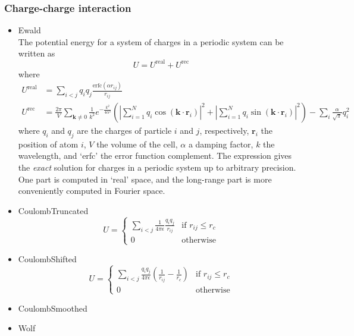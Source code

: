 \subsubsection{Charge-charge interaction}
\begin{itemize}
\item{Ewald}\\
The potential energy for a system of charges in a periodic system can be written as
\begin{equation}
 U=U^{\text{real}}+U^{\text{rec}}
\end{equation}
where
\begin{equation}
 \begin{split}
 U^{\text{real}}
  &=\sum_{i<j} q_i q_j \frac{\text{erfc}\left(\alpha r_{ij}\right)}{r_{ij}}\\
 U^{\text{rec}}
  &=\frac{2\pi}{V}\sum_{\mathbf{k}\not=0}\frac{1}{k^2} e^{-\frac{k^2}{4\alpha^2}}
  \left(\left|\sum_{i=1}^N q_i\cos\left(\mathbf{k}\cdot\mathbf{r}_i\right)\right|^2+
   \left|\sum_{i=1}^N q_i\sin\left(\mathbf{k}\cdot\mathbf{r}_i\right)\right|^2\right)
 -\sum_i\frac{\alpha}{\sqrt{\pi}}q_i^2
 \end{split}
\end{equation}
where $q_i$ and $q_j$ are the charges of particle $i$ and $j$, respectively, $\mathbf{r}_i$ the position of atom $i$, $V$ the volume of the cell,
$\alpha$ a damping factor, $k$ the wavelength, and `erfc' the error function complement. The expression gives the \emph{exact} solution for charges
in a periodic system up to arbitrary precision. One part is computed in `real' space, and the long-range part is more conveniently computed in Fourier space.

\item{CoulombTruncated}
\begin{equation}
 U=\begin{cases}
    \sum_{i<j} \frac{1}{4\pi\epsilon}\frac{q_i q_j}{r_{ij}}& \text{if }r_{ij}\leq r_c\\
    0 & \text{otherwise}
   \end{cases}
\end{equation}

\item{CoulombShifted}
\begin{equation}
 U=\begin{cases}
    \sum_{i<j} \frac{q_i q_j}{4\pi \epsilon }\left(\frac{1}{r_{ij}}-\frac{1}{r_c}\right)& \text{if }r_{ij}\leq r_c\\
    0 & \text{otherwise}
   \end{cases}
\end{equation}

\item{CoulombSmoothed}
\item{Wolf}

\end{itemize}

